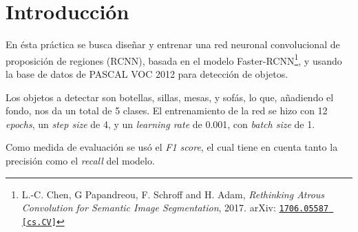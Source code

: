 \section{Introducción}
En ésta práctica se busca diseñar y entrenar una red neuronal convolucional de proposición de regiones (RCNN), basada en el modelo Faster-RCNN\footnote{L.-C. Chen, G Papandreou, F. Schroff and H. Adam, \textit{Rethinking Atrous Convolution for Semantic Image Segmentation}, 2017. arXiv: \href{https://arxiv.org/abs/1706.05587}{\texttt{1706.05587 [cs.CV]}}}, y usando la base de datos de PASCAL VOC 2012 para detección de objetos.

Los objetos a detectar son botellas, sillas, mesas, y sofás, lo que, añadiendo el fondo, nos da un total de 5 clases. El entrenamiento de la red se hizo con 12 \textit{epochs}, un \textit{step size} de 4, y un \textit{learning rate} de 0.001, con \textit{batch size} de 1.

Como medida de evaluación se usó el \textit{F1 score}, el cual tiene en cuenta tanto la precisión como el \textit{recall} del modelo.

